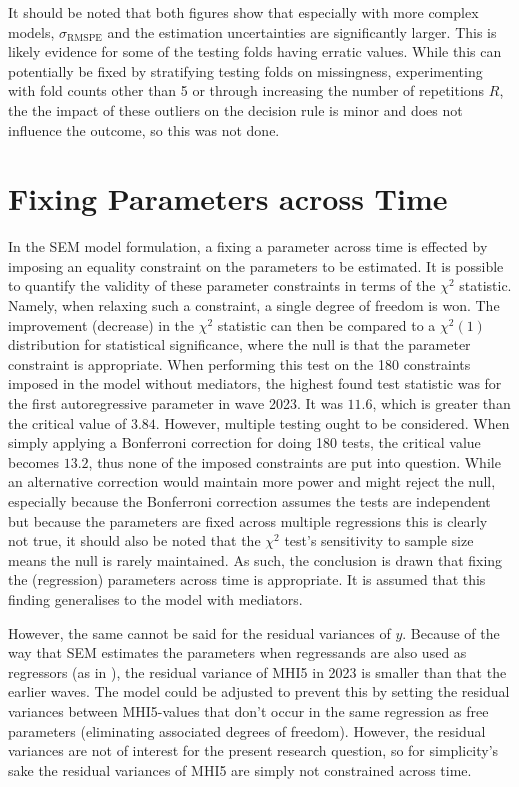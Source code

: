 It should be noted that both figures show that especially with more complex models, $\sigma_{\text{RMSPE}}$ and the estimation uncertainties
are significantly larger. This is likely evidence for some of the testing folds having erratic values.
While this can potentially be fixed by stratifying testing folds on missingness, experimenting with fold counts other than 5 or
through increasing the number of repetitions $R$, the the impact of these outliers on the decision rule is minor and does
not influence the outcome, so this was not done.

\section{Fixing Parameters across Time}
\label{sec:modelling:parameter_fixing}
In the SEM model formulation, a fixing a parameter across time is effected by imposing an equality constraint on the
parameters to be estimated.
It is possible to quantify the validity of these parameter constraints in terms of the $\chi^2$ statistic.
Namely, when relaxing such a constraint, a single degree of freedom is won. The improvement (decrease) in the $\chi^2$
statistic can then be compared to a $\chi^2(1)$ distribution for statistical significance, where the null is
that the parameter constraint is appropriate.
When performing this test on the 180 constraints imposed in the model without mediators, the highest found test
statistic was for the first autoregressive parameter in wave 2023. It was $11.6$, which is greater than the critical
value of $3.84$. However, multiple testing ought to be considered.
When simply applying a Bonferroni correction for doing 180 tests, the critical value becomes $13.2$, thus none of the
imposed constraints are put into question.
While an alternative correction would maintain more power and might reject the null, especially because
the Bonferroni correction assumes the tests are independent but because the parameters are fixed across multiple
regressions this is clearly not true, it should also be noted that
the $\chi^2$ test's sensitivity to sample size means the null is rarely maintained. As such, the conclusion is drawn
that fixing the (regression) parameters across time is appropriate.
It is assumed that this finding generalises to the model with mediators.

However, the same cannot be said for the residual variances of $y$. Because of the way that SEM estimates the
parameters when regressands are also used as regressors (as in ),
the residual variance of MHI5 in 2023 is smaller than that the earlier waves. The model could be adjusted
to prevent this by setting the residual variances between MHI5-values that don't occur in the same regression as free
parameters (eliminating associated degrees of freedom). However, the residual variances are not of interest for the present
research question, so for simplicity's sake the residual variances of MHI5 are simply not constrained across time.
